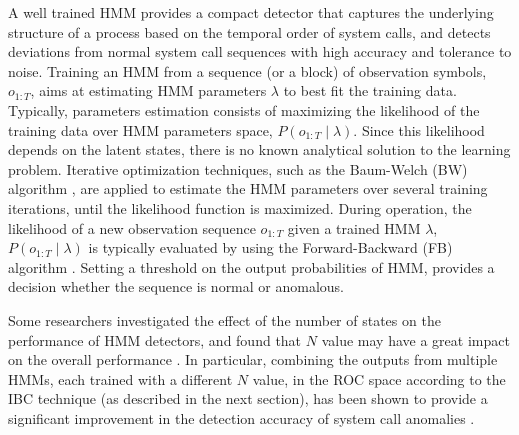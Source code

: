 A well trained HMM provides a compact detector that captures the underlying structure of a process based on the temporal order of system calls, and detects deviations from normal system call sequences with high accuracy and tolerance to noise.
Training an HMM from a sequence (or a block) of observation symbols, $o_{1:T}$, aims at estimating HMM parameters $\lambda$ to best fit the training data.
 Typically, parameters estimation consists of maximizing the likelihood of the training data over HMM parameters space, $P(o_{1:T}\mid\lambda)$.
Since this likelihood depends on the latent states, there is no known analytical solution to the learning problem.
Iterative optimization techniques, such as the Baum-Welch (BW) algorithm \cite{Baum1970}, are applied to estimate the HMM parameters over several training iterations, until the likelihood function is maximized.
During operation, the likelihood of a new observation sequence $o_{1:T}$ given a trained HMM $\lambda$, $P(o_{1:T}\mid\lambda)$ is typically evaluated by using the Forward-Backward (FB) algorithm \cite{Khreich2012-INS,Rabiner1989}.
Setting a threshold on the output probabilities of HMM, provides a decision whether the sequence is normal or anomalous.

Some researchers investigated the effect of the number of states on the performance of HMM detectors, and found that $N$ value may have a great impact on the overall performance \cite{Yeung2003,Khreich2009-ICC}.
In particular, combining the outputs from multiple HMMs, each trained with a different $N$ value, in the ROC space according to the IBC technique (as described in the next section), has been shown to provide a significant improvement in the detection accuracy of system call anomalies \cite{Khreich2010-ICPR}.
 
